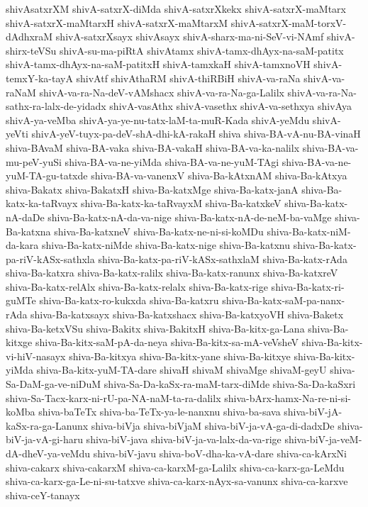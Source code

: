{shivAsatxrXM
shivA-satxrX-diMda
shivA-satxrXkekx
shivA-satxrX-maMtarx
shivA-satxrX-maMtarxH
shivA-satxrX-maMtarxM
shivA-satxrX-maM-torxV-dAdhxraM
shivA-satxrXsayx
shivAsayx
shivA-sharx-ma-ni-SeV-vi-NAmf
shivA-shirx-teVSu
shivA-su-ma-piRtA
shivAtamx
shivA-tamx-dhAyx-na-saM-patitx
shivA-tamx-dhAyx-na-saM-patitxH
shivA-tamxkaH
shivA-tamxnoVH
shivA-temxY-ka-tayA
shivAtf
shivAthaRM
shivA-thiRBiH
shivA-va-raNa
shivA-va-raNaM
shivA-va-ra-Na-deV-vAMshacx
shivA-va-ra-Na-ga-Lalilx
shivA-va-ra-Na-sathx-ra-lalx-de-yidadx
shivA-vasAthx
shivA-vasethx
shivA-va-sethxya
shivAya
shivA-ya-veMba
shivA-ya-ye-nu-tatx-laM-ta-muR-Kada
shivA-yeMdu
shivA-yeVti
shivA-yeV-tuyx-pa-deV-shA-dhi-kA-rakaH
shiva
shiva-BA-vA-nu-BA-vinaH
shiva-BAvaM
shiva-BA-vaka
shiva-BA-vakaH
shiva-BA-va-ka-nalilx
shiva-BA-va-mu-peV-yuSi
shiva-BA-va-ne-yiMda
shiva-BA-va-ne-yuM-TAgi
shiva-BA-va-ne-yuM-TA-gu-tatxde
shiva-BA-va-vanenxV
shiva-Ba-kAtxnAM
shiva-Ba-kAtxya
shiva-Bakatx
shiva-BakatxH
shiva-Ba-katxMge
shiva-Ba-katx-janA
shiva-Ba-katx-ka-taRvayx
shiva-Ba-katx-ka-taRvayxM
shiva-Ba-katxkeV
shiva-Ba-katx-nA-daDe
shiva-Ba-katx-nA-da-va-nige
shiva-Ba-katx-nA-de-neM-ba-vaMge
shiva-Ba-katxna
shiva-Ba-katxneV
shiva-Ba-katx-ne-ni-si-koMDu
shiva-Ba-katx-niM-da-kara
shiva-Ba-katx-niMde
shiva-Ba-katx-nige
shiva-Ba-katxnu
shiva-Ba-katx-pa-riV-kASx-sathxla
shiva-Ba-katx-pa-riV-kASx-sathxlaM
shiva-Ba-katx-rAda
shiva-Ba-katxra
shiva-Ba-katx-ralilx
shiva-Ba-katx-ranunx
shiva-Ba-katxreV
shiva-Ba-katx-relAlx
shiva-Ba-katx-relalx
shiva-Ba-katx-rige
shiva-Ba-katx-ri-guMTe
shiva-Ba-katx-ro-kukxda
shiva-Ba-katxru
shiva-Ba-katx-saM-pa-nanx-rAda
shiva-Ba-katxsayx
shiva-Ba-katxshacx
shiva-Ba-katxyoVH
shiva-Baketx
shiva-Ba-ketxVSu
shiva-Bakitx
shiva-BakitxH
shiva-Ba-kitx-ga-Lana
shiva-Ba-kitxge
shiva-Ba-kitx-saM-pA-da-neya
shiva-Ba-kitx-sa-mA-veVsheV
shiva-Ba-kitx-vi-hiV-nasayx
shiva-Ba-kitxya
shiva-Ba-kitx-yane
shiva-Ba-kitxye
shiva-Ba-kitx-yiMda
shiva-Ba-kitx-yuM-TA-dare
shivaH
shivaM
shivaMge
shivaM-geyU
shiva-Sa-DaM-ga-ve-niDuM
shiva-Sa-Da-kaSx-ra-maM-tarx-diMde
shiva-Sa-Da-kaSxri
shiva-Sa-Tacx-karx-ni-rU-pa-NA-naM-ta-ra-dalilx
shiva-bArx-hamx-Na-re-ni-si-koMba
shiva-baTeTx
shiva-ba-TeTx-ya-le-nanxnu
shiva-ba-sava
shiva-biV-jA-kaSx-ra-ga-Lanunx
shiva-biVja
shiva-biVjaM
shiva-biV-ja-vA-ga-di-dadxDe
shiva-biV-ja-vA-gi-haru
shiva-biV-java
shiva-biV-ja-va-lalx-da-va-rige
shiva-biV-ja-veM-dA-dheV-ya-veMdu
shiva-biV-javu
shiva-boV-dha-ka-vA-dare
shiva-ca-kArxNi
shiva-cakarx
shiva-cakarxM
shiva-ca-karxM-ga-Lalilx
shiva-ca-karx-ga-LeMdu
shiva-ca-karx-ga-Le-ni-su-tatxve
shiva-ca-karx-nAyx-sa-vanunx
shiva-ca-karxve
shiva-ceY-tanayx
}
